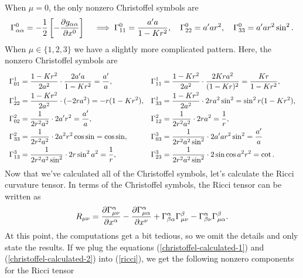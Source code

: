 \documentclass{lkx_pset}
\begin{document}
\begin{solution}
	When $\mu=0$, the only nonzero Christoffel symbols are
	\begin{equation}\label{christoffel-calculated-1}
		\Gamma^0_{\alpha\alpha} = -\frac{1}{2}\left[-\frac{\partial g_{\alpha\alpha}}{\partial x^0}\right]\quad \implies \Gamma^0_{11} = \frac{a'a}{1-Kr^2}, \quad \Gamma^0_{22}=a'a r^2,\quad \Gamma^0_{33}=a'ar^2\sin^2.
	\end{equation}
	When $\mu\in \{1,2,3\}$ we have a slightly more complicated pattern. Here, the nonzero Christoffel symbols are
	\begin{equation}\label{christoffel-calculated-2}
		\everymath={\displaystyle}
		\renewcommand*{\arraystretch}{2}
		\begin{array}{ll}
			\Gamma^1_{01} = \frac{1-Kr^2}{2a^2}\cdot \frac{2a'a}{1-Kr^2} = \frac{a'}{a},
			 & \Gamma^1_{11} = \frac{1-Kr^2}{2a^2}\cdot\frac{2Kra^2}{(1-Kr)^2} = \frac{Kr}{1-Kr^2}, \\
			\Gamma^1_{22} = \frac{1-Kr^2}{2a^2}\cdot(-2ra^2) =-r(1-Kr^2),
			 & \Gamma^1_{33} = \frac{1-Kr^2}{2a^2}\cdot 2ra^2\sin^2 = \sin^2r(1-Kr^2),              \\
			\Gamma^2_{02} = \frac{1}{2r^2a^2}\cdot 2a'r^2 = \frac{a'}{a},
			 & \Gamma^2_{12} = \frac{1}{2r^2a^2}\cdot 2ra^2 = \frac{1}{r},                          \\
			\Gamma^2_{33} = \frac{1}{2r^2a^2}\cdot 2a^2r^2\cos\sin=\cos\sin,
			 & \Gamma^3_{03} = \frac{1}{2r^2a^2\sin^2}\cdot 2a'a r^2\sin^2 = \frac{a'}{a} \\
			\Gamma^3_{13} = \frac{1}{2r^2a^2\sin^2}\cdot 2r\sin^2 a^2 = \frac{1}{r},
			 & \Gamma^3_{23} = \frac{1}{2r^2a^2\sin^2}\cdot 2\sin\cos a^2r^2 = \cot.                \\
		\end{array}
	\end{equation}
	Now that we've calculated all of the Christoffel symbols, let's calculate the Ricci curvature tensor. In terms of the Christoffel symbols, the Ricci tensor can be written as
	\begin{equation}\label{ricci}
		R_{\mu\nu} = \frac{\partial \Gamma^\alpha_{\mu\nu}}{\partial x^\alpha} - \frac{\partial \Gamma^\alpha_{\mu\alpha}}{\partial x^\nu} + \Gamma^\alpha_{\beta\alpha}\Gamma^\beta_{\mu\nu} - \Gamma^\alpha_{\beta\nu} \Gamma^\beta_{\mu\alpha}.
	\end{equation}
	At this point, the computations get a bit tedious, so we omit the details and only state the results.
	If we plug the equations (\ref{christoffel-calculated-1}) and (\ref{christoffel-calculated-2}) into (\ref{ricci}), we get the following nonzero components for the Ricci tensor

\end{solution}
\end{document}
